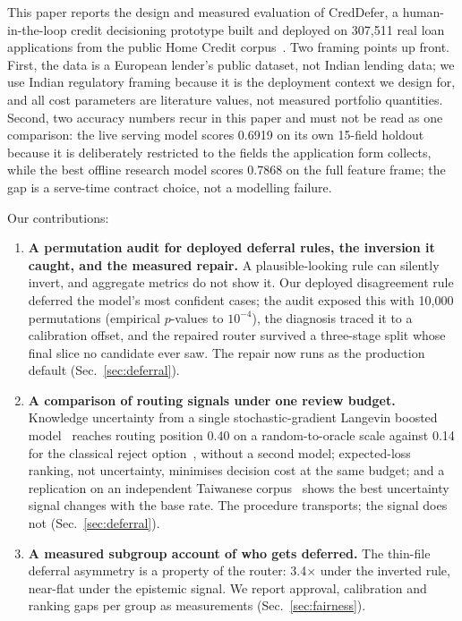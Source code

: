 \documentclass[conference]{IEEEtran}
\begin{document}
This paper reports the design and measured evaluation of CredDefer, a
human-in-the-loop credit decisioning prototype built and deployed on
307{,}511 real loan applications from the public Home Credit
corpus~\cite{homecredit}. Two framing points up front. First, the data is a
European lender's public dataset, not Indian lending data; we use Indian
regulatory framing because it is the deployment context we design for, and
all cost parameters are literature values, not measured portfolio
quantities. Second, two accuracy numbers recur in this paper and must not be
read as one comparison: the live serving model scores 0.6919 on its own
15-field holdout because it is deliberately restricted to the fields the
application form collects, while the best offline research model scores
0.7868 on the full feature frame; the gap is a serve-time contract choice,
not a modelling failure.

Our contributions:

\begin{enumerate}
\item \textbf{A permutation audit for deployed deferral rules, the inversion
it caught, and the measured repair.} A plausible-looking rule can silently
invert, and aggregate metrics do not show it. Our deployed disagreement rule
deferred the model's most confident cases; the audit exposed this with
10{,}000 permutations (empirical $p$-values to $10^{-4}$), the diagnosis
traced it to a calibration offset, and the repaired router survived a
three-stage split whose final slice no candidate ever saw. The repair now
runs as the production default (Sec.~\ref{sec:deferral}).
\item \textbf{A comparison of routing signals under one review budget.}
Knowledge uncertainty from a single stochastic-gradient Langevin boosted
model~\cite{ustimenko2021,malinin2021} reaches routing position 0.40 on a
random-to-oracle scale against 0.14 for the classical reject
option~\cite{chow1970}, without a second model; expected-loss ranking, not
uncertainty, minimises decision cost at the same budget; and a replication
on an independent Taiwanese corpus~\cite{yeh2009} shows the best uncertainty
signal changes with the base rate. The procedure transports; the signal does
not (Sec.~\ref{sec:deferral}).
\item \textbf{A measured subgroup account of who gets deferred.} The
thin-file deferral asymmetry is a property of the router: 3.4$\times$ under
the inverted rule, near-flat under the epistemic signal. We report approval,
calibration and ranking gaps per group as measurements
(Sec.~\ref{sec:fairness}).
\end{enumerate}
\end{document}
